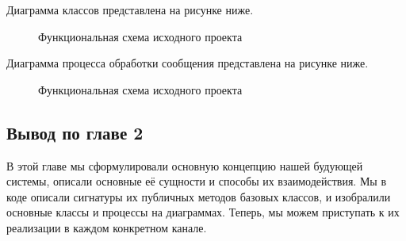     Диаграмма классов представлена на рисунке ниже.
    \begin{figure}[!h]
        \centering
        \caption{Функциональная схема исходного проекта}
        \label{fig:func-schema-before}
    \end{figure}

    Диаграмма процесса обработки сообщения представлена на рисунке ниже.
    \begin{figure}[!h]
        \centering
        \caption{Функциональная схема исходного проекта}
        \label{fig:func-schema-before}
    \end{figure}

    \subsection{Вывод по главе 2}
    В этой главе мы сформулировали основную концепцию нашей будующей системы, описали основные
    её сущности и способы их взаимодействия. Мы в коде описали сигнатуры их публичных методов базовых
    классов, и изобралили основные классы и процессы на диаграммах.
    Теперь, мы можем приступать к их реализации в каждом конкретном канале.
